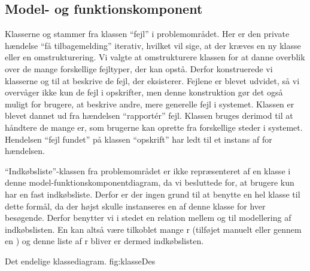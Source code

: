 \subsection{Model- og funktionskomponent}
\label{sec:modelfunktion}
% 

Klasserne  og  stammer fra klassen ``fejl'' i problemområdet. Her er den private hændelse ``få tilbagemelding'' iterativ, hvilket vil sige, at der kræves en ny klasse eller en omstrukturering. Vi valgte at omstrukturere klassen for at danne overblik over de mange forskellige fejltyper, der kan opstå. Derfor konstruerede vi klasserne  og  til at beskrive de fejl, der eksisterer. Fejlene er blevet udvidet, så vi overvåger ikke kun de fejl i opskrifter, men denne konstruktion gør det også muligt for brugere, at beskrive andre, mere generelle fejl i systemet. Klassen  er blevet dannet ud fra hændelsen ``rapport\'{e}r'' fejl. Klassen  bruges derimod til at håndtere de mange er, som brugerne kan oprette fra forskellige steder i systemet. Hendelsen ``fejl fundet'' på klassen ``opskrift'' har \fx ledt til et instans af  for hændelsen. 

``Indkøbsliste''-klassen fra problemområdet er ikke repræsenteret af en klasse i denne model-funktionskomponentdiagram, da vi besluttede for, at brugere kun har en fast indkøbsliste. Derfor er der ingen grund til at benytte en hel klasse til dette formål, da der højst skulle instanseres en af denne klasse for hver besøgende. Derfor benytter vi i stedet en relation mellem  og  til modellering af indkøbslisten. En  kan altså være tilkoblet mange r (tilføjet manuelt eller gennem en ) og denne liste af r bliver er dermed indkøbslisten.

	{Det endelige klassediagram.}
	{fig:klasseDes}
